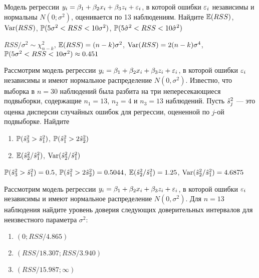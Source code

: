 \documentclass[pdftex,11pt,openany]{book}\usepackage[]{graphicx}\usepackage[]{color}
\begin{document}
\begin{solution}
\end{solution}


\begin{problem}
 Модель регрессии $y_i = \beta_1 + \beta_2 x_i + \beta_3 z_i + \e_i$, в которой ошибки
$\e_i$ независимы и нормальны $N(0;\sigma^2)$, оценивается по 13 наблюдениям. Найдите $\E(RSS)$, $\Var(RSS)$, $\P(5\sigma^2<RSS<10\sigma^2)$, $\P(5\hat{\sigma}^2<RSS<10\hat{\sigma}^2)$
\end{problem}
 
\begin{solution}
 $RSS/\sigma^2\sim\chi^2_{n-k}$, $\E(RSS)=(n-k)\sigma^2$, $\Var(RSS)=2(n-k)\sigma^4$, $\P(5\sigma^2<RSS<10\sigma^2)\approx 0.451$ 
\end{solution}


\begin{problem}
 Рассмотрим модель регрессии $y_i=\beta_1+\beta_2 x_i + \beta_3 z_i+\e_i$, в которой
ошибки $\e_i$ независимы и имеют нормальное распределение $N(0,\sigma^2)$. Известно, что выборка в $n = 30$
наблюдений была разбита на три непересекающиеся подвыборки, содержащие $n_1 = 13$, $n_2 = 4$ и $n_3 = 13$ наблюдений. Пусть $\hs_{j}^2$ --- это оценка дисперсии случайных ошибок для
регрессии, оцененной по $j$-ой подвыборке. Найдите 
\begin{enumerate}
\item  $\P(\hs_3^2>\hs_1^2)$, $\P(\hs_1^2>2\hs_2^2)$
\item $\E(\hs_2^2/\hs_1^2)$, $\Var(\hs_2^2/\hs_1^2)$
\end{enumerate}
\end{problem}
 
\begin{solution}
 $\P(\hs_3^2>\hs_1^2)=0.5$, $\P(\hs_1^2>2\hs_2^2)=0.5044$, $\E(\hs_2^2/\hs_1^2)=1.25$, $\Var(\hs_2^2/\hs_1^2)=4.6875$
 \end{solution}

\begin{problem}
 Рассмотрим модель регрессии $y_i=\beta_1+\beta_2 x_i + \beta_3 z_i+\e_i$, в которой
ошибки $\e_i$ независимы и имеют нормальное распределение $N(0,\sigma^2)$. Для $n = 13$ наблюдения найдите уровень
доверия следующих доверительных интервалов для неизвестного параметра $\sigma^2$:
\begin{enumerate}
\item $(0;RSS/4.865)$ 
\item $(RSS/18.307;RSS/3.940)$
\item $(RSS/15.987;\infty)$
\end{enumerate}
\end{problem}
 
\end{document}
